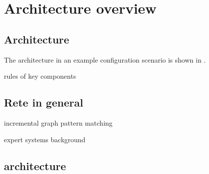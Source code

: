 \section{Architecture overview}
\label{sec:architecture}

\subsection{Architecture}
\label{architecture}

The \iqd{} architecture in an example configuration scenario is shown in .

rules of key components


\subsection{Rete in general}
\label{subsec:rete}

incremental graph pattern matching

expert systems background



\subsection{\iqd{} architecture}


